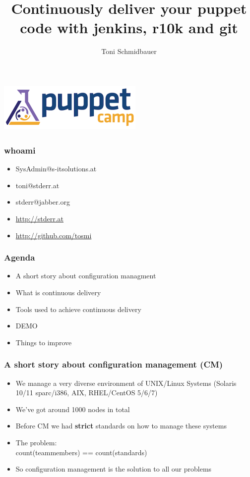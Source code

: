 \documentclass{beamer}
\title{Continuously deliver your puppet code with jenkins, r10k and git\\}
\author{Toni Schmidbauer}
\begin{document}
\begin{frame}
  \center\includegraphics[height=2.5cm,width=7cm]{../pics/puppetcamp_300dpi}
  \titlepage
\end{frame}

\begin{frame}
  \frametitle{whoami}
  \begin{itemize}
  \item SysAdmin@s-itsolutions.at
  \item toni@stderr.at
  \item stderr@jabber.org
  \item \url{http://stderr.at}
  \item \url{http://github.com/tosmi}
  \end{itemize}
\end{frame}
\begin{frame}

  \frametitle{Agenda}

  \begin{itemize}
  \item A short story about configuration managment
  \item What is continuous delivery
  \item Tools used to achieve continuous delivery
  \item DEMO
  \item Things to improve
  \end{itemize}

\end{frame}

\begin{frame}
  \frametitle{A short story about configuration management (CM)}

  \begin{itemize}
  \item<1-> We manage a very diverse environment of UNIX/Linux Systems (Solaris 10/11 sparc/i386, AIX, RHEL/CentOS 5/6/7)
  \item<2-> We've got around 1000 nodes in total
  \item<3-> Before CM we had \textbf{strict} standards on how to manage these systems
  \item<4-> The problem: \\count(teammembers) == count(standards)
  \item<5-> So configuration management is the solution to all our problems
  \end{itemize}

\end{frame}
\end{document}
